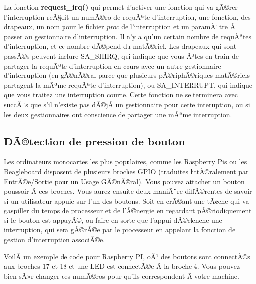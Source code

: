 \documentclass[11pt]{article}
\begin{document}
La fonction \textbf{request\_irq()} qui permet d'activer une fonction qui va gÃ©rer l'interruption reÃ§oit un numÃ©ro de requÃªte d'interruption, une fonction, des drapeaux, un nom pour le fichier \emph{proc} de l'interruption et un paramÃ¨tre Ã  passer au gestionnaire d'interruption. Il n'y a qu'un certain nombre de requÃªtes d'interruption, et ce nombre dÃ©pend du matÃ©riel. Les drapeaux qui sont passÃ©s peuvent inclure SA\_SHIRQ, qui indique que vous Ãªtes en train de partager la requÃªte d'interruption en cours avec un autre gestionnaire d'interruption (en gÃ©nÃ©ral parce que plusieurs pÃ©riphÃ©riques matÃ©riels partagent la mÃªme requÃªte d'interruption), ou SA\_INTERRUPT, qui indique que vous traitez une interruption courte. Cette fonction ne se terminera avec succÃ¨s que s'il n'existe pas dÃ©jÃ  un gestionnaire pour cette interuption, ou si les deux gestionnaires ont conscience de partager une mÃªme interruption.

\subsection*{DÃ©tection de pression de bouton}
\label{sec-15-2}

Les ordinateurs monocartes les plus populaires, comme les Raspberry Pis ou les Beagleboard disposent de plusieurs broches GPIO (traduites littÃ©ralement par EntrÃ©e/Sortie pour un Usage GÃ©nÃ©ral). Vous pouvez attacher un bouton poussoir Ã  ces broches. Vous aurez ensuite deux maniÃ¨re diffÃ©rentes de savoir si un utilisateur appuie sur l'un des boutons. Soit en crÃ©ant une tÃ¢che qui va gaspiller du temps de processeur et de l'Ã©nergie en regardant pÃ©riodiquement si le bouton est appuyÃ©, ou faire en sorte que l'appui dÃ©clenche une interruption, qui sera gÃ©rÃ©e par le processeur en appelant la fonction de gestion d'interruption associÃ©e.

VoilÃ  un exemple de code pour Raspberry PI, oÃ¹ des boutons sont connectÃ©s aux broches 17 et 18 et une LED est connectÃ©e Ã  la broche 4. Vous pouvez bien sÃ»r changer ces numÃ©ros pour qu'ils correspondent Ã  votre machine.
\end{document}
